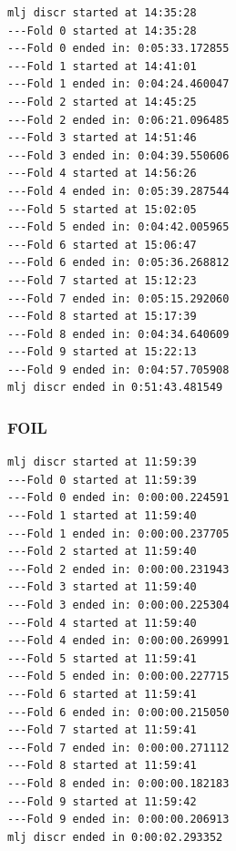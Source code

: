 \begin{verbatim}
mlj discr started at 14:35:28
---Fold 0 started at 14:35:28
---Fold 0 ended in: 0:05:33.172855
---Fold 1 started at 14:41:01
---Fold 1 ended in: 0:04:24.460047
---Fold 2 started at 14:45:25
---Fold 2 ended in: 0:06:21.096485
---Fold 3 started at 14:51:46
---Fold 3 ended in: 0:04:39.550606
---Fold 4 started at 14:56:26
---Fold 4 ended in: 0:05:39.287544
---Fold 5 started at 15:02:05
---Fold 5 ended in: 0:04:42.005965
---Fold 6 started at 15:06:47
---Fold 6 ended in: 0:05:36.268812
---Fold 7 started at 15:12:23
---Fold 7 ended in: 0:05:15.292060
---Fold 8 started at 15:17:39
---Fold 8 ended in: 0:04:34.640609
---Fold 9 started at 15:22:13
---Fold 9 ended in: 0:04:57.705908
mlj discr ended in 0:51:43.481549
\end{verbatim}
\subsubsection{FOIL}

\begin{verbatim}
mlj discr started at 11:59:39
---Fold 0 started at 11:59:39
---Fold 0 ended in: 0:00:00.224591
---Fold 1 started at 11:59:40
---Fold 1 ended in: 0:00:00.237705
---Fold 2 started at 11:59:40
---Fold 2 ended in: 0:00:00.231943
---Fold 3 started at 11:59:40
---Fold 3 ended in: 0:00:00.225304
---Fold 4 started at 11:59:40
---Fold 4 ended in: 0:00:00.269991
---Fold 5 started at 11:59:41
---Fold 5 ended in: 0:00:00.227715
---Fold 6 started at 11:59:41
---Fold 6 ended in: 0:00:00.215050
---Fold 7 started at 11:59:41
---Fold 7 ended in: 0:00:00.271112
---Fold 8 started at 11:59:41
---Fold 8 ended in: 0:00:00.182183
---Fold 9 started at 11:59:42
---Fold 9 ended in: 0:00:00.206913
mlj discr ended in 0:00:02.293352
\end{verbatim}

